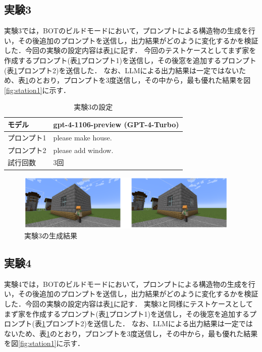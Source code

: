 \subsection{実験3}\label{sec:ex3}
実験3では，BOTのビルドモードにおいて，プロンプトによる構造物の生成を行い，その後追加のプロンプトを送信し，出力結果がどのように変化するかを検証した．今回の実験の設定内容は表\ref{tab:setting3}に記す．
今回のテストケースとしてまず家を作成するプロンプト(表\ref{tab:setting3}プロンプト1)を送信し，その後窓を追加するプロンプト(表\ref{tab:setting3}プロンプト2)を送信した．
なお、LLMによる出力結果は一定ではないため、表\ref{tab:setting3}のとおり，プロンプトを3度送信し，その中から，最も優れた結果を図\ref{fig:station1}に示す．

\begin{table}[H]
    \caption{実験3の設定}\label{tab:setting3}
    \centering
    \begin{tabular}{ll}
        \hline \hline
        モデル & gpt-4-1106-preview (GPT-4-Turbo) \\
        \hline
        プロンプト1 & please make house. \\
        \hline
        プロンプト2 & please add window. \\
        \hline
        試行回数 & 3回 \\
        \hline
    \end{tabular}
\end{table}

\begin{figure}[H]
    \centering
    \includegraphics[width=0.95\textwidth]{fig/add_window.PNG}
    \caption{実験3の生成結果}
    \label{fig:add_window}
\end{figure}

\subsection{実験4}\label{sec:ex4}
実験4では，BOTのビルドモードにおいて，プロンプトによる構造物の生成を行い，その後追加のプロンプトを送信し，出力結果がどのように変化するかを検証した．今回の実験の設定内容は表\ref{tab:setting3}に記す．
実験3と同様にテストケースとしてまず家を作成するプロンプト(表\ref{tab:setting3}プロンプト1)を送信し，その後窓を追加するプロンプト(表\ref{tab:setting3}プロンプト2)を送信した．
なお、LLMによる出力結果は一定ではないため、表\ref{tab:setting3}のとおり，プロンプトを3度送信し，その中から，最も優れた結果を図\ref{fig:station1}に示す．

